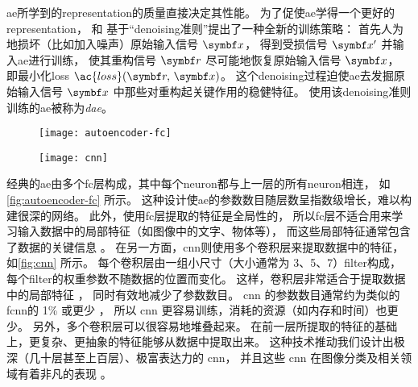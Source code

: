 \ac{ae}所学到的\ac{representation}的质量直接决定其性能。
为了促使\ac{ae}学得一个更好的\ac{representation}，
 和 
基于\enquote{\ac{denoising}准则}提出了一种全新的训练策略：
首先人为地损坏（比如加入噪声）原始输入信号 $\B{x}$，
得到受损信号 $\B{x}'$ 并输入\ac{ae}进行训练，
使其重构信号 $\B{r}$ 尽可能地恢复原始输入信号 $\B{x}$，
即最小化\acl{loss} $\ac{loss}(\B{r}, \,\B{x})$。
这个\ac{denoising}过程迫使\ac{ae}去发掘原始输入信号 $\B{x}$
中那些对重构起关键作用的稳健特征。
使用该\ac{denoising}准则训练的\ac{ae}被称为\emph{\ac{dae}}。

\begin{figure}[htp]
  \centering
  \texttt{[image: autoencoder-fc]}
  \label{fig:autoencoder-fc}
\end{figure}

\begin{figure}[htp]
  \centering
  \texttt{[image: cnn]}
  \label{fig:cnn}
\end{figure}

经典的\ac{ae}由多个\ac{fc}层构成，其中每个\ac{neuron}都与上一层的所有\ac{neuron}相连，
如\autoref{fig:autoencoder-fc} 所示。
这种设计使\ac{ae}的参数数目随层数呈指数级增长，难以构建很深的网络。
此外，使用\ac{fc}层提取的特征是全局性的，
所以\ac{fc}层不适合用来学习输入数据中的局部特征（如图像中的文字、物体等），
而这些局部特征通常包含了数据的关键信息 \cite{masci2011}。
在另一方面，\ac{cnn}则使用多个卷积层来提取数据中的特征，如\autoref{fig:cnn} 所示。
每个卷积层由一组小尺寸（大小通常为 3、5、7）\ac{filter}构成，
每个\ac{filter}的权重参数不随数据的位置而变化。
这样，卷积层非常适合于提取数据中的局部特征 \cite{leCun1998}，
同时有效地减少了参数数目。
\ac{cnn} 的参数数目通常约为类似的\ac{fc}\ac{nn}的 1\% 或更少 \cite{grais2017}，
所以 \ac{cnn} 更容易训练，消耗的资源（如内存和时间）也更少。
另外，多个卷积层可以很容易地堆叠起来。
在前一层所提取的特征的基础上，更复杂、更抽象的特征能够从数据中提取出来。
这种技术推动我们设计出极深（几十层甚至上百层）、极富表达力的 \ac{cnn}，
并且这些 \ac{cnn} 在图像分类及相关领域有着非凡的表现
\cite{krizhevsky2012,simonyan2014,szegedy2015,ma2019}。

